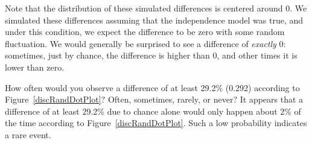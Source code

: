 Note that the distribution of these simulated differences is centered around 0. We simulated these differences assuming that the independence model was true, and under this condition, we expect the difference to be zero with some random fluctuation. We would generally be surprised to see a difference of \emph{exactly} 0: sometimes, just by chance, the difference is higher than 0, and other times it is lower than zero.

\begin{example}{How often would you observe a difference of at least 29.2\% (0.292) according to Figure~\ref{discRandDotPlot}? Often, sometimes, rarely, or never?}
It appears that a difference of at least 29.2\% due to chance alone would only happen about 2\% of the time according to Figure~\ref{discRandDotPlot}. Such a low probability indicates a rare event.
\end{example}

